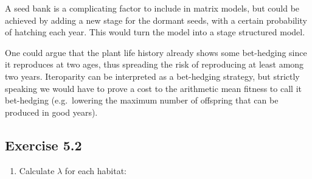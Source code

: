 \documentclass[
]{book}
\newenvironment{Shaded}{\begin{snugshade}}{\end{snugshade}}
\newcommand{\AttributeTok}[1]{\textcolor[rgb]{0.77,0.63,0.00}{#1}}
\newcommand{\CommentTok}[1]{\textcolor[rgb]{0.56,0.35,0.01}{\textit{#1}}}
\newcommand{\DecValTok}[1]{\textcolor[rgb]{0.00,0.00,0.81}{#1}}
\newcommand{\FloatTok}[1]{\textcolor[rgb]{0.00,0.00,0.81}{#1}}
\newcommand{\FunctionTok}[1]{\textcolor[rgb]{0.00,0.00,0.00}{#1}}
\newcommand{\NormalTok}[1]{#1}
\newcommand{\OtherTok}[1]{\textcolor[rgb]{0.56,0.35,0.01}{#1}}
\newcommand{\SpecialCharTok}[1]{\textcolor[rgb]{0.00,0.00,0.00}{#1}}
\newcommand{\StringTok}[1]{\textcolor[rgb]{0.31,0.60,0.02}{#1}}
\providecommand{\tightlist}{%
  \setlength{\itemsep}{0pt}\setlength{\parskip}{0pt}}
\begin{document}
A seed bank is a complicating factor to include in matrix models, but could be achieved by adding a new stage for the dormant seeds, with a certain probability of hatching each year. This would turn the model into a stage structured model.

One could argue that the plant life history already shows some bet-hedging since it reproduces at two ages, thus spreading the risk of reproducing at least among two years. Iteroparity can be interpreted as a bet-hedging strategy, but strictly speaking we would have to prove a cost to the arithmetic mean fitness to call it bet-hedging (e.g.~lowering the maximum number of offspring that can be produced in good years).

\hypertarget{exercise-5.2-1}{%
\subsection*{Exercise 5.2}\label{exercise-5.2-1}}

\begin{enumerate}
\def\labelenumi{\arabic{enumi}.}
\tightlist
\item
  Calculate \(\lambda\) for each habitat:
\end{enumerate}

\begin{Shaded}
\end{Shaded}
\end{document}
